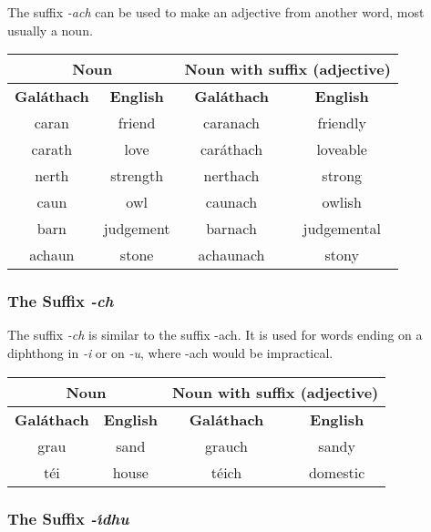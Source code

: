 The suffix \textit{-ach} can be used to make an adjective from another word, most usually a noun.
\begin{table}[H]
\centering
\begin{tabular}{cccc}
  \toprule
  \multicolumn{2}{c}{\textbf{Noun}} & \multicolumn{2}{c}{\textbf{Noun with suffix (adjective)}}\\
  \midrule
  \textbf{Gal\'{a}thach} & \textbf{English} & \textbf{Gal\'{a}thach} & \textbf{English}\\
  \cmidrule(lr){1-1}\cmidrule(lr){2-2}\cmidrule(lr){3-3}\cmidrule(lr){4-4}
  caran & friend & caranach & friendly\\
  carath & love & car\'{a}thach & loveable\\
  nerth & strength & nerthach & strong\\
  caun & owl & caunach & owlish\\
  barn & judgement & barnach & judgemental\\
  achaun & stone & achaunach & stony\\
  \bottomrule
\end{tabular}
\label{examples_suffix_ach}
\end{table}

\subsubsection{The Suffix \textit{-ch}}
The suffix \textit{-ch} is similar to the suffix -ach. It is used for words ending on a diphthong in \textit{-i} or on \textit{-u}, where -ach would be impractical.
\begin{table}[H]
\centering
\begin{tabular}{cccc}
  \toprule
  \multicolumn{2}{c}{\textbf{Noun}} & \multicolumn{2}{c}{\textbf{Noun with suffix (adjective)}}\\
  \midrule
  \textbf{Gal\'{a}thach} & \textbf{English} & \textbf{Gal\'{a}thach} & \textbf{English}\\
  \cmidrule(lr){1-1}\cmidrule(lr){2-2}\cmidrule(lr){3-3}\cmidrule(lr){4-4}
  grau & sand & grauch & sandy\\
  t\'{e}i & house & t\'{e}ich & domestic\\
  \bottomrule
\end{tabular}
\label{examples_suffix_ch}
\end{table}

\subsubsection{The Suffix \textit{-\'{\i}dhu}}

